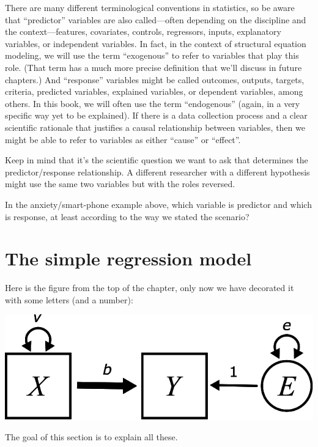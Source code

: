\documentclass[
]{book}
\begin{document}
There are many different terminological conventions in statistics, so be aware that ``predictor'' variables are also called---often depending on the discipline and the context---features, covariates, controls, regressors, inputs, explanatory variables, or independent variables. In fact, in the context of structural equation modeling, we will use the term ``exogenous'' to refer to variables that play this role. (That term has a much more precise definition that we'll discuss in future chapters.) And ``response'' variables might be called outcomes, outputs, targets, criteria, predicted variables, explained variables, or dependent variables, among others. In this book, we will often use the term ``endogenous'' (again, in a very specific way yet to be explained). If there is a data collection process and a clear scientific rationale that justifies a causal relationship between variables, then we might be able to refer to variables as either ``cause'' or ``effect''.

Keep in mind that it's the scientific question we want to ask that determines the predictor/response relationship. A different researcher with a different hypothesis might use the same two variables but with the roles reversed.

In the anxiety/smart-phone example above, which variable is predictor and which is response, at least according to the way we stated the scenario?

\hypertarget{simple-model}{%
\section{The simple regression model}\label{simple-model}}

Here is the figure from the top of the chapter, only now we have decorated it with some letters (and a number):

\begin{center}\includegraphics{graphics/simple_regression_params} \end{center}

The goal of this section is to explain all these.
\end{document}
